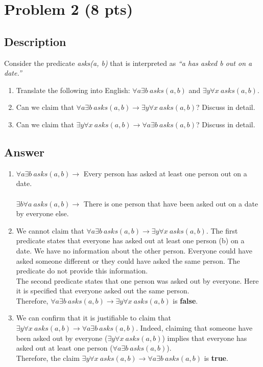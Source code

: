 \newpage

\section{Problem 2 (8 pts)}
\subsection{Description}

Consider the predicate \textit{asks(a, b)} that is interpreted as \textit{``a has asked b out on a date.''}
\begin{enumerate}
\item Translate the following into English: $\forall a \exists b~asks(a, b)$ and $\exists y \forall x ~asks(a, b)$.
\item Can we claim that $\forall a \exists b~asks(a, b) \rightarrow \exists y \forall x ~asks(a, b)$? Discuss in detail.
\item Can we claim that $\exists y \forall x ~asks(a, b) \rightarrow \forall a \exists b~asks(a, b)$? Discuss in detail.
\end{enumerate}

\subsection{Answer}

\begin{enumerate}
  \item $\forall a \exists b~asks(a, b)\rightarrow$ Every person has asked at least one person out on a date.\\
  \\
  $\exists b \forall a~asks(a, b)\rightarrow$ There is one person that have been asked out on a date by everyone else.
  \item  We cannot claim that
  $\forall a \exists b~asks(a, b) \rightarrow \exists y \forall x ~asks(a, b)$. 
  The first predicate states that everyone has asked out at least one person (b) on a date. We have no information
  about the other person. Everyone could have asked someone different or they could have asked the same person. The
  predicate do not provide this information.\\
  The second predicate states that one person was asked out by everyone. Here it is specified that everyone asked out
  the same person.\\
  Therefore,
  $\forall a \exists b~asks(a, b) \rightarrow \exists y \forall x ~asks(a, b)$
   is \textbf{false}.
  \item We can confirm that it is justifiable to claim that
  $\exists y \forall x ~asks(a, b) \rightarrow \forall a \exists b~asks(a, b)$.
  Indeed, claiming that someone have been asked out by everyone ($\exists y \forall x ~asks(a, b)$) implies that 
  everyone has asked out at least one person ($\forall a \exists b~asks(a, b)$).\\
  Therefore, the claim
  $\exists y \forall x ~asks(a, b) \rightarrow \forall a \exists b~asks(a, b)$
  is \textbf{true}.
\end{enumerate}

